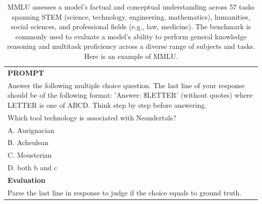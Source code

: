 \begin{table}[h]
    \centering \small
        \caption{MMLU assesses a model's factual and conceptual understanding across 57 tasks spanning STEM (science, technology, engineering, mathematics), humanities, social sciences, and professional fields (e.g., law, medicine). The benchmark is commonly used to evaluate a model's ability to perform general knowledge reasoning and multitask proficiency across a diverse range of subjects and tasks. Here is an example of MMLU. }
    \label{tab:mmlu_eval_format_example}
    \begin{tabular}{p{}}
    \hline
    \textbf{PROMPT}\\
    Answer the following multiple choice question. The last line of your response should be of the following format: 'Answer: \$LETTER' (without quotes) where LETTER is one of ABCD. Think step by step before answering.\\[1ex] 
    Which tool technology is associated with Neandertals?\\[1ex]
    A. Aurignacian\\
    B. Acheulean\\
    C. Mousterian\\
    D. both b and c \\ \hline
      \textbf{Evaluation}\\
      Parse the last line in response to judge if the  choice equals to ground truth. \\ \hline
    \end{tabular}
\end{table}

